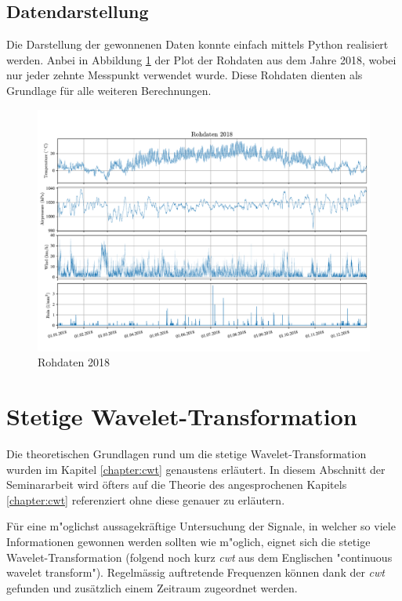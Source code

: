 \begin{refsection}
\subsection{Datendarstellung}
Die Darstellung der gewonnenen Daten konnte einfach mittels Python realisiert werden.
Anbei in Abbildung \ref{fig:rawdata} der Plot der Rohdaten aus dem Jahre 2018, wobei nur jeder zehnte Messpunkt verwendet wurde.
Diese Rohdaten dienten als Grundlage für alle weiteren Berechnungen. 
\begin{figure}
	\centering
	\includegraphics[width=1\textwidth]{papers/wwt/images/raw.pdf}
	\caption{Rohdaten 2018}
	\label{fig:rawdata}
\end{figure}


\section{Stetige Wavelet-Transformation}
Die theoretischen Grundlagen rund um die stetige Wavelet-Transformation wurden im Kapitel \ref{chapter:cwt} genaustens erläutert. 
In diesem Abschnitt der Seminararbeit wird öfters auf die Theorie des angesprochenen Kapitels \ref{chapter:cwt} referenziert ohne diese genauer zu erläutern. 

Für eine m"oglichst aussagekräftige Untersuchung der Signale, in welcher so viele Informationen gewonnen werden sollten wie m"oglich, eignet sich die stetige Wavelet-Transformation (folgend noch kurz \textit{cwt} aus dem Englischen "continuous wavelet transform"). 
Regelmässig auftretende Frequenzen können dank der \textit{cwt} gefunden und zusätzlich einem Zeitraum zugeordnet werden.

\end{refsection}
